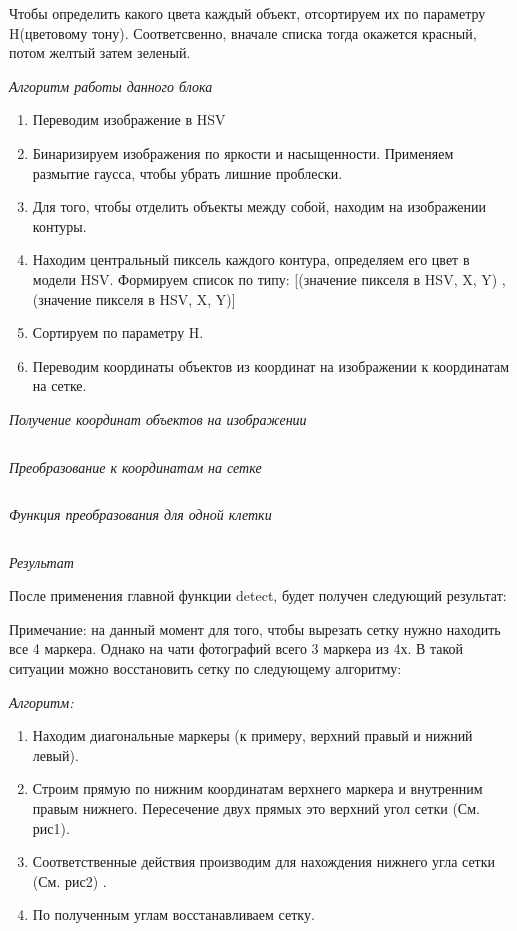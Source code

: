 Чтобы определить какого цвета каждый объект, отсортируем их по параметру H(цветовому тону). Соответсвенно, вначале списка тогда окажется красный, потом желтый затем зеленый.

\textit{Алгоритм работы данного блока}
\begin{enumerate}
    \item Переводим изображение в HSV
    \item Бинаризируем изображения по яркости и насыщенности. Применяем размытие гаусса, чтобы убрать лишние проблески.
    \item Для того, чтобы отделить объекты между собой, находим на изображении контуры.
    \item Находим центральный пиксель каждого контура, определяем его цвет в модели HSV. Формируем список по типу: [(значение пикселя в HSV, X, Y) , (значение пикселя в HSV, X, Y)]
    \item   Сортируем по параметру H.
    \item Переводим координаты объектов из координат на изображении к координатам на сетке.
\end{enumerate}

\textit{Получение координат объектов на изображении}

\inputminted[fontsize=\footnotesize, linenos]{python}{2nd_tour/ar/task_68/source_5.py}

\textit{Преобразование к координатам на сетке}

\inputminted[fontsize=\footnotesize, linenos]{python}{2nd_tour/ar/task_68/source_6.py}

\textit{Функция преобразования для одной клетки}

\inputminted[fontsize=\footnotesize, linenos]{python}{2nd_tour/ar/task_68/source_7.py}

\textit{Результат}

После применения главной функции detect, будет получен следующий результат:


Примечание: на данный момент для того, чтобы вырезать сетку нужно находить все 4 маркера. Однако на чати фотографий всего 3 маркера из 4х. В такой ситуации можно восстановить сетку по следующему алгоритму:

\textit{Алгоритм:}
\begin{enumerate}
    \item Находим диагональные маркеры (к примеру, верхний правый и нижний левый).
    \item Строим прямую по нижним координатам верхнего маркера и внутренним правым нижнего. Пересечение двух прямых это верхний угол сетки (См. рис1).
    \item Соответственные действия производим для нахождения нижнего угла сетки (См. рис2) .
    \item По полученным углам восстанавливаем сетку.
\end{enumerate}

